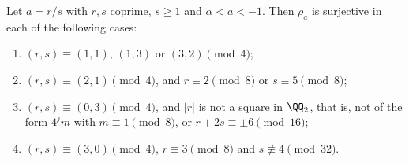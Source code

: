 \begin{corollary}
  \label{cor:interval-classes}
  \leanok
  Let $a = r/s$ with $r, s$ coprime, $s \ge 1$ and $\alpha < a < -1$. Then $\rho_a$ is surjective
  in each of the following cases:
  \begin{enumerate}
    \item $(r, s) \equiv (1, 1)$, $(1, 3)$ or $(3, 2) \pmod 4$;
    \item $(r, s) \equiv (2, 1) \pmod 4$, and $r \equiv 2 \pmod 8$ or $s \equiv 5 \pmod 8$;
    \item $(r, s) \equiv (0, 3) \pmod 4$, and $|r|$ is not a square in $\QQ_2$, that is, not of the
          form $4^j m$ with $m \equiv 1 \pmod 8$, or $r + 2s \equiv \pm 6 \pmod{16}$;
    \item $(r, s) \equiv (3, 0) \pmod 4$, $r \equiv 3 \pmod 8$ and $s \not\equiv 4 \pmod{32}$.
  \end{enumerate}
\end{corollary}
